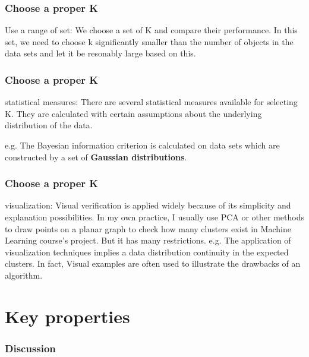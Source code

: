 \documentclass[9pt]{beamer}
\newcommand{\ccp}[1]{{\color{purple}#1}}
\begin{document}
\begin{frame}
	\frametitle{Choose a proper K}
\ccp{Use a range of set}: We choose a set of K and compare their performance. In this set, we need to choose k \ccp{significantly smaller than the number of objects in the data sets and let it be resonably large based on this}.\par


\end{frame}

\begin{frame}
	\frametitle{Choose a proper K}
\ccp{statistical measures}: There are several statistical measures available for selecting K. \ccp{They are calculated with certain assumptions about the underlying distribution of the data.} \par
e.g. The Bayesian information criterion is calculated on data sets which are constructed by a set of \textbf{Gaussian distributions}. \par
\end{frame}

\begin{frame}
	\frametitle{Choose a proper K}
\ccp{visualization}: Visual verification is applied widely because of its simplicity and explanation possibilities. In my own practice, I usually use PCA or other methods to draw points on a planar graph to check how many clusters exist in Machine Learning course's project. But it has many restrictions. e.g. The application of
visualization techniques implies a data distribution continuity in the expected clusters. In fact, Visual examples are often used to illustrate the drawbacks of an algorithm. \par

\end{frame}

\section{Key properties}
\begin{frame}
	\frametitle{Discussion}

\end{frame}
\end{document}
